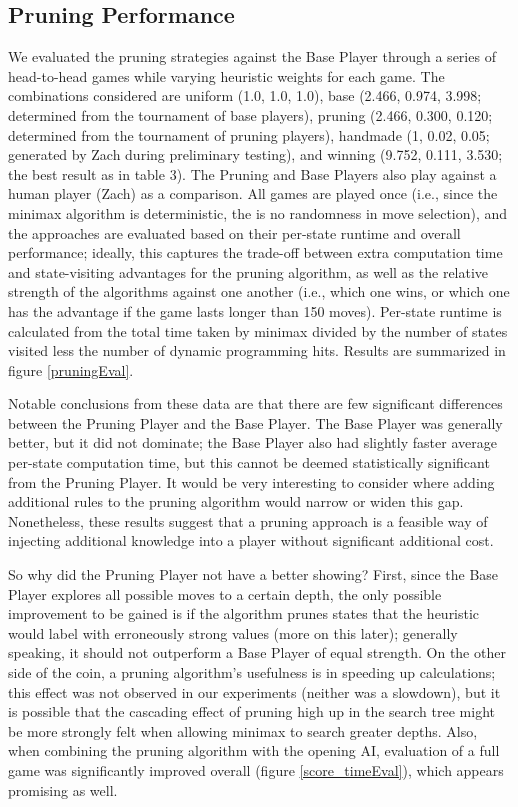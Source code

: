 \documentclass[letterpaper]{article}
\begin{document}
\subsection{Pruning Performance}
We evaluated the pruning strategies against the Base Player through a series of head-to-head games while varying heuristic weights for each game.  The combinations considered are uniform (1.0, 1.0, 1.0), base (2.466, 0.974, 3.998; determined from the tournament of base players), pruning (2.466, 0.300, 0.120; determined from the tournament of pruning players), handmade (1, 0.02, 0.05; generated by Zach during preliminary testing), and winning (9.752, 0.111, 3.530; the best result as in table 3).  The Pruning and Base Players also play against a human player (Zach) as a comparison.  All games are played once (i.e., since the minimax algorithm is deterministic, the is no randomness in move selection), and the approaches are evaluated based on their per-state runtime and overall performance; ideally, this captures the trade-off between extra computation time and state-visiting advantages for the pruning algorithm, as well as the relative strength of the algorithms against one another (i.e., which one wins, or which one has the advantage if the game lasts longer than 150 moves).  Per-state runtime is calculated from the total time taken by minimax divided by the number of states visited less the number of dynamic programming hits.  Results are summarized in figure \ref{pruningEval}.

Notable conclusions from these data are that there are few significant differences between the Pruning Player and the Base Player.  The Base Player was generally better, but it did not dominate; the Base Player also had slightly faster average per-state computation time, but this cannot be deemed statistically significant from the Pruning Player.  It would be very interesting to consider where adding additional rules to the pruning algorithm would narrow or widen this gap.  Nonetheless, these results suggest that a pruning approach is a feasible way of injecting additional knowledge into a player without significant additional cost.

So why did the Pruning Player not have a better showing?  First, since the Base Player explores all possible moves to a certain depth, the only possible improvement to be gained is if the algorithm prunes states that the heuristic would label with erroneously strong values (more on this later); generally speaking, it should not outperform a Base Player of equal strength.  On the other side of the coin, a pruning algorithm's usefulness is in speeding up calculations; this effect was not observed in our experiments (neither was a slowdown), but it is possible that the cascading effect of pruning high up in the search tree might be more strongly felt when allowing minimax to search greater depths.  Also, when combining the pruning algorithm with the opening AI, evaluation of a full game was significantly improved overall (figure \ref{score_timeEval}), which appears promising as well.
\end{document}
